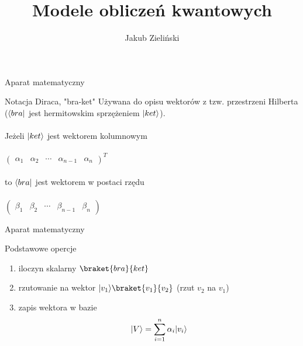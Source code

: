 \documentclass{beamer}
\title{Modele obliczeń kwantowych}
\author{Jakub Zieliński}
\institute{Wydział Elektroniki i Technik Informacyjnych\\ Politechnika Warszawska}
\date{}
\DeclarePairedDelimiter\bra{\langle}{\rvert}
\DeclarePairedDelimiter\ket{\lvert}{\rangle}
\begin{document}
	
	
	\begin{frame}
	\titlepage
	\end{frame}
	
	\begin{frame}{Aparat matematyczny}
		
		\begin{block}{Notacja Diraca, "bra-ket"}
			\vspace{0.5em}
			Używana do opisu wektorów z tzw. przestrzeni Hilberta ($\bra{bra}$ jest hermitowskim sprzężeniem $\ket{ket}$).\\~\\
			Jeżeli $\ket{ket}$ jest wektorem kolumnowym \\~\\
			\centering
			$
			\begin{pmatrix}
			\alpha_{1} &\alpha_{2} & \cdots &\alpha_{n-1} &\alpha_{n} 
			\end{pmatrix}
			^{T}
			$\\~\\
			\flushleft
			to $\bra{bra}$ jest wektorem w postaci rzędu\\~\\ 
			\centering
			$
			\begin{pmatrix}
			\beta_{1} &\beta_{2} & \cdots &\beta_{n-1} &\beta_{n} 
			\end{pmatrix}
			$
			\vspace{0.5em}
		\end{block}
	\end{frame}	

	\begin{frame}{Aparat matematyczny}
		\begin{block}{Podstawowe opercje}
			\vspace{0.5em}
			\begin{enumerate}
				\item iloczyn skalarny $\braket{bra}{ket}$
				\item rzutowanie na wektor $\ket{v_{1}}\braket{v_{1}}{v_{2}}$ (rzut $v_{2}$ na $v_{1}$)
				\item zapis wektora w bazie $$\ket{V} = \sum\limits_{i=1}^n \alpha_{i}\ket{v_{i}}$$
			\end{enumerate}	
			\vspace{0.5em}
		\end{block}
	\end{frame}
	
\end{document}

